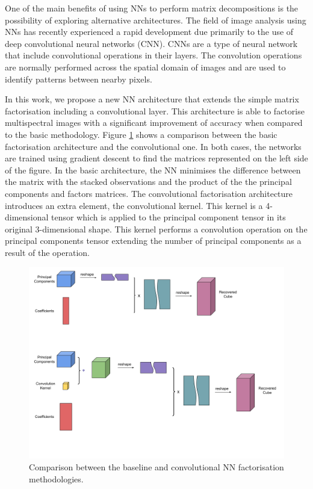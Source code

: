 \documentclass[essd, manuscript]{copernicus}
\begin{document}
One of the main benefits of using NNs to perform matrix decompositions is the possibility of exploring alternative architectures. The field of image analysis using NNs has recently experienced a rapid development due primarily to the use of deep convolutional neural networks (CNN). CNNs are a type of neural network that include convolutional operations in their layers. The convolution operations are normally performed across the spatial domain of images and are used to identify patterns between nearby pixels.

In this work, we propose a new NN architecture that extends the simple matrix factorisation including a convolutional layer. This architecture is able to factorise multispectral images with a significant improvement of accuracy when compared to the basic methodology. Figure \ref{factorisation_methods} shows a comparison between the basic factorisation architecture and the convolutional one. In both cases, the networks are trained using gradient descent to find the matrices represented on the left side of the figure. In the basic architecture, the NN minimises the difference between the matrix with the stacked observations and the product of the the principal components and factors matrices. The convolutional factorisation architecture introduces an extra element, the convolutional kernel. This kernel is a 4-dimensional tensor which is applied to the principal component tensor in its original 3-dimensional shape. This kernel performs a convolution operation on the principal components tensor extending the number of principal components as a result of the operation. 

\begin{figure}%
    \includegraphics[width=14cm]{fig6.png}
    \caption{Comparison between the baseline and convolutional NN factorisation methodologies.}%
    \label{factorisation_methods}%
\end{figure}
\end{document}
